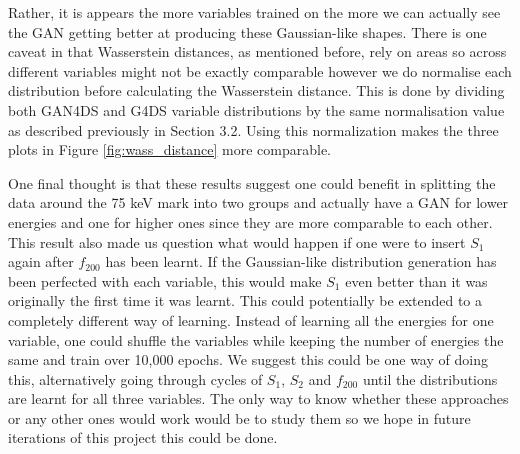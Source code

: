 \documentclass[11pt]{article} %
\begin{document}
Rather, it is appears the more variables trained on the more we can actually see the GAN
getting better at producing these Gaussian-like shapes.
There is one caveat in that Wasserstein distances, as mentioned before, rely on areas so across different variables might not be exactly comparable
however we do normalise each distribution before calculating the Wasserstein distance.
This is done by dividing both GAN4DS and G4DS variable distributions by the same normalisation value as described previously in Section 3.2.
Using this normalization makes the three plots in Figure \ref{fig:wass_distance} more comparable.
\\
\par One final thought is that these results suggest one could benefit in splitting the data around the 75 keV mark into two groups and actually
have a GAN for lower energies and one for higher ones since they are more comparable to each other.
This result also made us question what would happen if one were to insert $S_1$ again after $f_{200}$ has been learnt.
If the Gaussian-like distribution generation has been perfected with each variable, this would make $S_1$ even better than it was originally the first
time it was learnt.
This could potentially be extended to a completely different way of learning.
Instead of learning all the energies for one variable, one could shuffle the variables while keeping the number of energies the same and train over 10,000 epochs.
We suggest this could be one way of doing this, alternatively going through cycles of $S_1$, $S_2$ and $f_{200}$ until the distributions are
learnt for all three variables.
The only way to know whether these approaches or any other ones would work would be to study them
so we hope in future iterations of this project this could be done.
\end{document}
